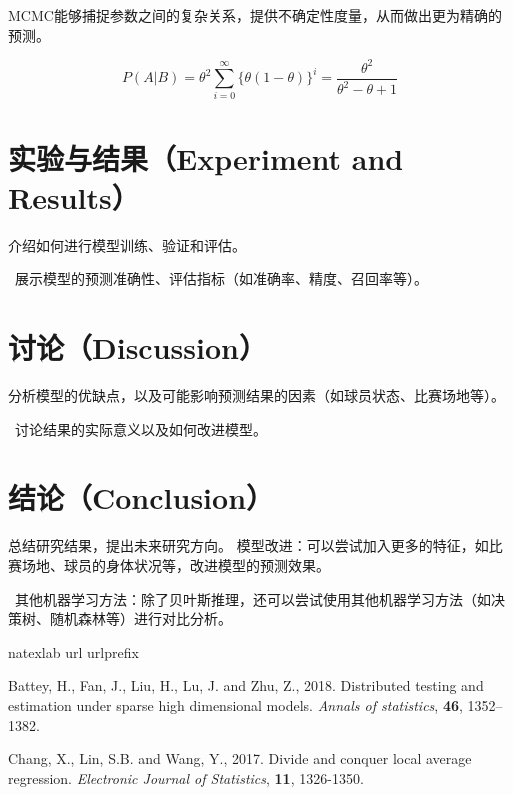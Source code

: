 \documentclass[12pt]{article}
\begin{document}
MCMC能够捕捉参数之间的复杂关系，提供不确定性度量，从而做出更为精确的预测。


$$P(A|B)=\theta^2	\sum_{i = 0}^{\infty}	\{\theta (1-\theta ) \}^i = \frac{\theta ^2}{\theta ^2 - \theta +1}    $$


\section{实验与结果（Experiment and Results）}
介绍如何进行模型训练、验证和评估。

\
展示模型的预测准确性、评估指标（如准确率、精度、召回率等）。


\section{讨论（Discussion）}
分析模型的优缺点，以及可能影响预测结果的因素（如球员状态、比赛场地等）。

\
讨论结果的实际意义以及如何改进模型。


\section{结论（Conclusion）}
总结研究结果，提出未来研究方向。
模型改进：可以尝试加入更多的特征，如比赛场地、球员的身体状况等，改进模型的预测效果。

\
其他机器学习方法：除了贝叶斯推理，还可以尝试使用其他机器学习方法（如决策树、随机森林等）进行对比分析。






\begin{thebibliography}{100}
	\expandafter\ifx\csname natexlab\endcsname\relax\def\natexlab#1{#1}\fi
	\expandafter\ifx\csname url\endcsname\relax
	\def\url#1{\texttt{#1}}\fi
	\expandafter\ifx\csname urlprefix\endcsname\relax\def\urlprefix{URL }\fi

Battey, H., Fan, J., Liu, H., Lu, J. and Zhu, Z., 2018. Distributed testing and estimation under sparse high dimensional models. \textit{Annals of statistics}, \textbf{46}, 1352–1382.

\bibitem[Chang et al.(2017)]{chang2017divide}
Chang, X., Lin, S.B. and Wang, Y., 2017. Divide and conquer local average regression. \textit{Electronic Journal of Statistics}, \textbf{11}, 1326-1350.

\end{thebibliography}
\end{document}
